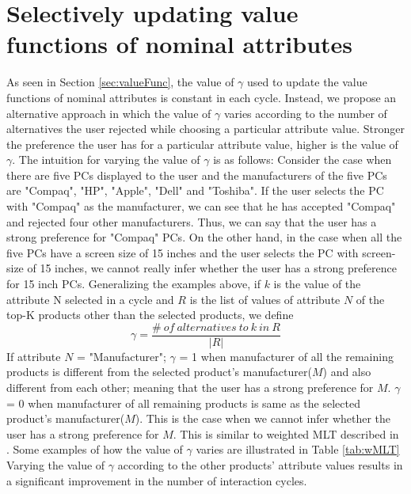 \section{Selectively updating value functions of nominal attributes}
As seen in Section \ref{sec:valueFunc}, the value of $\gamma$ used to update the value functions of nominal attributes is constant in each cycle.
Instead, we propose an alternative approach in which the value of $\gamma$ varies according to the number of alternatives the user rejected while choosing a particular attribute value. 
Stronger the preference the user has for a particular attribute value, higher is the value of $\gamma$.
The intuition for varying the value of $\gamma$ is as follows: Consider the case when there are five PCs displayed to the user and the manufacturers of the five PCs are "Compaq", "HP", "Apple", "Dell" and "Toshiba".
If the user selects the PC with "Compaq" as the manufacturer, we can see that he has accepted "Compaq" and rejected four other manufacturers.
Thus, we can say that the user has a strong preference for "Compaq" PCs.
On the other hand, in the case when all the five PCs have a screen size of 15 inches and the user selects the PC with screen-size of 15 inches, we cannot really infer whether the user has a strong preference for 15 inch PCs.
Generalizing the examples above, if $k$ is the value of the attribute N selected in a cycle and $R$ is the list of values of attribute $N$ of the top-K products other than the selected products, we define
%
\begin{equation}
\gamma = \frac{\#\: of\: alternatives\: to\: k\: in\: R}{|R|}
\end{equation}
%
If attribute $N$ = "Manufacturer"; $\gamma$ = 1 when manufacturer of all the remaining products is different from the selected product's manufacturer($M$) and also different from each other; meaning that the user has a strong preference for $M$.
$\gamma$ = 0 when manufacturer of all remaining products is same as the selected product's manufacturer($M$).
This is the case when we cannot infer whether the user has a strong preference for $M$.
This is similar to weighted MLT described in \cite{comparisonbr}.
Some examples of how the value of $\gamma$ varies are illustrated in Table \ref{tab:wMLT}
Varying the value of $\gamma$ according to the other products' attribute values results in a significant improvement in the number of interaction cycles.



